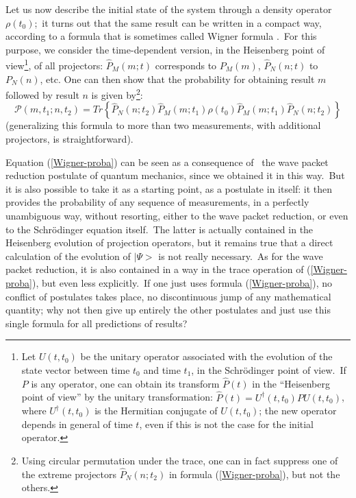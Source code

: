 \documentclass[12pt,onecolumn]{article}%
\begin{document}
Let us now describe the initial state of the system through a density operator
$\rho(t_{0})$;\ it turns out that the same result can be written in a compact
way, according to a formula that is sometimes called Wigner formula
\cite{Wigner1} \cite{Wigner-formule}.\ For this purpose, we consider the
time-dependent version, in the Heisenberg point of view\footnote{Let
$U(t,t_{0})$ be the unitary operator associated with the evolution of the
state vector between time $t_{0}$ and time $t_{1}$, in the Schr\"{o}dinger
point of view.\ If $P$ is any operator, one can obtain its transform
$\widehat{P}(t)$ in the ``Heisenberg point of view'' by the unitary
transformation: $\widehat{P}(t)=U^{\dagger}(t,t_{0})PU(t,t_{0})$, where
$U^{\dagger}(t,t_{0})$ is the Hermitian conjugate of $U(t,t_{0})$; the new
operator depends in general of time $t$, even if this is not the case for the
initial operator.}, of all projectors: $\widehat{P}_{M}(m;t)$ corresponds to
$P_{M}(m)$, $\widehat{P}_{N}(n;t)$ to $P_{N}(n)$, etc. One can then show that
the probability for obtaining result $m$ followed by result $n$ is given
by\footnote{Using circular permutation under the trace, one can in fact
suppress one of the extreme projectors $\widehat{P}_{N}(n;t_{2})$ in formula
(\ref{Wigner-proba}), but not the others.}:
\begin{equation}
\mathcal{P}(m,t_{1};n,t_{2})=Tr\left\{  \widehat{P}_{N}(n;t_{2})\widehat
{P}_{M}(m;t_{1})\rho(t_{0})\widehat{P}_{M}(m;t_{1})\widehat{P}_{N}%
(n;t_{2})\right\}  \label{Wigner-proba}%
\end{equation}
(generalizing this formula to more than two measurements, with additional
projectors, is straightforward).

Equation (\ref{Wigner-proba}) can be seen as a consequence of \ the wave
packet reduction postulate of quantum mechanics, since we obtained it in this
way.\ But it is also possible to take it as a starting point, as a postulate
in itself: it then provides the probability of any sequence of measurements,
in a perfectly unambiguous way, without resorting, either to the wave packet
reduction, or even to the Schr\"{o}dinger equation itself.\ The latter is
actually contained in the Heisenberg evolution of projection operators, but it
remains true that a direct calculation of the evolution of $\mid\Psi>$ is not
really necessary.\ As for the wave packet reduction, it is also contained in a
way in the trace operation of (\ref{Wigner-proba}), but even less
explicitly.\ If one just uses formula (\ref{Wigner-proba}), no conflict of
postulates takes place, no discontinuous jump of any mathematical quantity;
why not then give up entirely the other postulates and just use this single
formula for all predictions of results?
\end{document}
